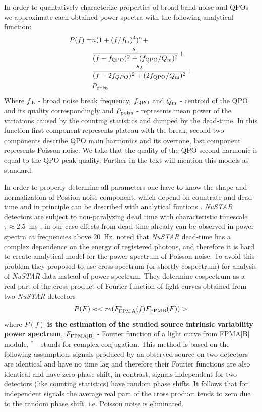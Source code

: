 \documentclass[a4paper,fleqn,usenatbib]{mnras}
\begin{document}
In order to quantatively characterize properties of broad band noise and QPOs we approximate each obtained power spectra with the following analytical function:
\begin{equation}
        \begin{aligned}
                P(f)  = & n (1 + (f/f_{\rm lb})^4)^{\alpha} + \\
                     &\frac{s_1}{(f - f_{\rm QPO})^2 + (f_{\rm QPO}/Q_{\rm m})^2} +\\
                        & \frac{s_2}{(f - 2f_{QPO})^2 + (2f_{\rm QPO}/Q_{\rm m})^2} + \\
                        & P_{\rm poiss}
\end{aligned}
        \label{eq:complex_fit}
\end{equation}
Where $f_{\rm lb}$ - broad noise break frequency, $f_{\rm QPO}$ and $Q_{\rm m}$ - centroid of the QPO and its quality correspondingly and $P_{\rm poiss}$ - represents mean power of the variations caused by the counting statistics and dumped by the dead-time.
In this function first component represents plateau with the break, second two components describe QPO main harmonics and its overtone, last component represents Poisson noise.
We take that the quality of the QPO second harmonic is equal to the QPO peak quality.
Further in the text will mention this models as standard.

In order to properly determine all parameters one have to know the shape and normalization of Possion noise component, which depend on countrate and dead time and in principle can be described with analytical funtions \citep[see, e.g.,][]{1994A&A...287...73V, 1995ApJ...449..930Z}.
{\it NuSTAR} detectors are subject to non-paralyzing dead time with characteristic timescale $\tau \approx 2.5$~ms \citep{2015ApJ...800..109B}, in our case effects from dead-time already can be observed in power spectra at frequencies above 20~Hz.
\citet{2015ApJ...800..109B} noted that {\it NuSTAR} dead-time has a complex dependence on the energy of registered photons, and therefore it is hard to create analytical model for the power spectrum of Poisson noise. 
To avoid this problem they proposed to use cross-spectrum (or shortly cospectrum) for analysis of {\it NuSTAR} data instead of power spectrum. 
They determine cospectrum as a real part of the cross product of Fourier function of light-curves obtained from two {\it NuSTAR} detectors 
\begin{equation}
        P(F) \approx <re(F_{\rm FPMA}^{*}(f)F_{\rm FPMB}(F))>
\end{equation}
where $P(f)$ {\bf is the estimation of the studied source intrinsic variability power spectrum}, $F_{\rm FPMA[B]}$ - Fourier function of a light curve from FPMA[B] module, $^{*}$ - stands for complex conjugation. 
This method is based on the following assumption: signals produced by an observed source on two detectors are identical and have no time lag and therefore their Fourier functions are also identical and have zero phase shift, in contrast, signals independent for two detectors (like counting statistics) have random phase shifts.  
It follows that for independent signals the average real part of the cross product tends to zero due to the random phase shift, i.e. Poisson noise is eliminated.
\end{document}
